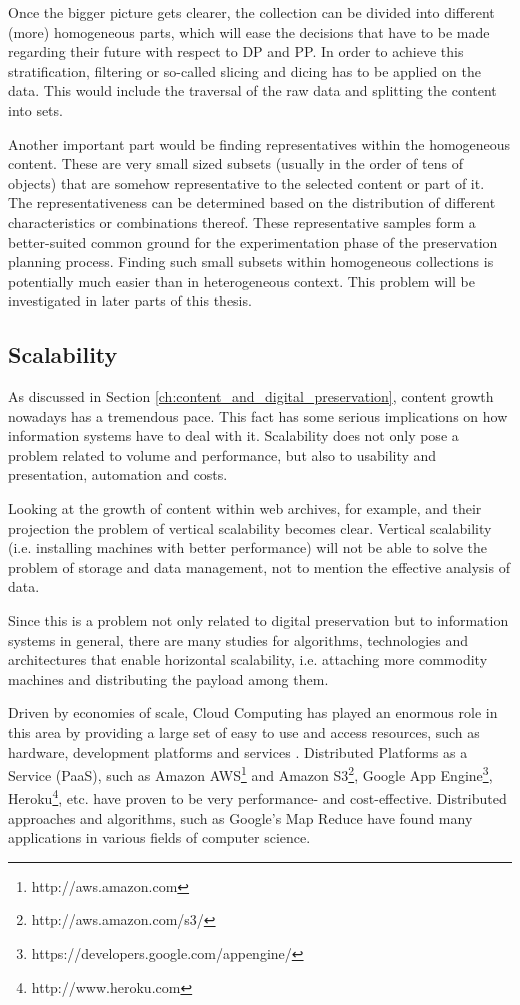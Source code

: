 Once the bigger picture gets clearer, the collection can be divided into different (more) homogeneous parts, which will ease the decisions that have to be made regarding their future with respect to DP and PP. In order to achieve this stratification, filtering or so-called slicing and dicing has to be applied on the data. This would include the traversal of the raw data and splitting the content into sets.

Another important part would be finding representatives within the homogeneous content. These are very small sized subsets (usually in the order of tens of objects) that are somehow representative to the selected content or part of it. The representativeness can be determined based on the distribution of different characteristics or combinations thereof. These representative samples form a better-suited common ground for the experimentation phase of the preservation planning process. Finding such small subsets within homogeneous collections is potentially much easier than in heterogeneous context. This problem will be investigated in later parts of this thesis.

\subsection{Scalability}
As discussed in Section \ref{ch:content_and_digital_preservation}, content growth nowadays has a tremendous pace. This fact has some serious implications on how information systems have to deal with it. Scalability does not only pose a problem related to volume and performance, but also to usability and presentation, automation and costs.

Looking at the growth of content within web archives, for example, and their projection the problem of vertical scalability becomes clear. Vertical scalability (i.e. installing machines with better performance) will not be able to solve the problem of storage and data management, not to mention the effective analysis of data.

Since this is a problem not only related to digital preservation but to information systems in general, there are many studies for algorithms, technologies and architectures that enable horizontal scalability, i.e. attaching more commodity machines and distributing the payload among them.

Driven by economies of scale, Cloud Computing has played an enormous role in this area by providing a large set of easy to use and access resources, such as hardware, development platforms and services \cite{Vaquero:2008, 4738445}. Distributed Platforms as a Service (PaaS), such as Amazon AWS\footnote{http://aws.amazon.com} and Amazon S3\footnote{http://aws.amazon.com/s3/}, Google App Engine\footnote{https://developers.google.com/appengine/}, Heroku\footnote{http://www.heroku.com}, etc. have proven to be very performance- and cost-effective. Distributed approaches and algorithms, such as Google's Map Reduce \cite{Dean:2008:MSD:1327452.1327492} have found many applications in various fields of computer science. 

